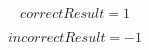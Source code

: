 \documentclass[letterpaper, 8pt]{extarticle}
\begin{document}
\begin{dmath*}
correctResult =
    1
\end{dmath*}


\begin{dmath*}
incorrectResult =
    -1
\end{dmath*}
\end{document}
